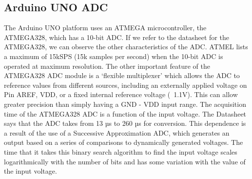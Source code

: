 \documentclass[10pt]{report}
\begin{document}
\subsection*{Arduino UNO ADC}
	The Arduino UNO platform uses an ATMEGA microcontroller, the ATMEGA328, which has a 10-bit ADC. If we refer to the datasheet for the ATMEGA328, we can observe the other characteristics of the ADC. ATMEL lists a maximum of 15kSPS (15k samples per second) when the 10-bit ADC is operated at maximum resolution. The other important feature of the ATMEGA328 ADC module is a ‘flexible multiplexer’ which allows the ADC to reference values from different sources, including an externally applied voltage on Pin AREF, VDD, or a fixed internal reference voltage (~1.1V). This can allow greater precision than simply having a GND - VDD input range. The acquisition time of the ATMEGA328 ADC is a function of the input voltage. The Datasheet says that the ADC takes from 13 µs to 260 µs for conversion. This dependence is a result of the use of a Successive Approximation ADC, which generates an output based on a series of comparisons to dynamically generated voltages. The time that it takes this binary search algorithm to find the input voltage scales logarithmically with the number of bits and has some variation with the value of the input voltage.

\end{document}

